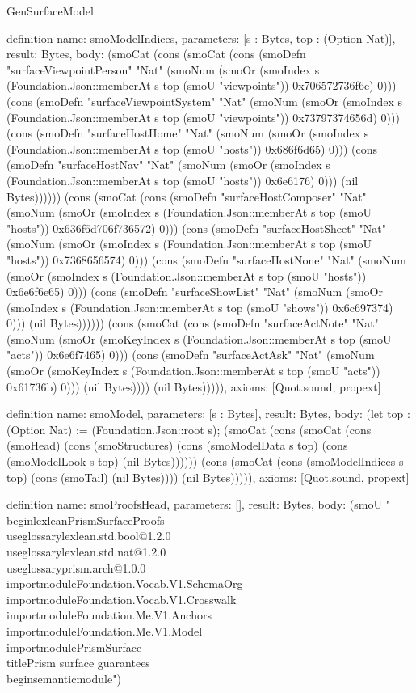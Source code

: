 \begin{lexlean}{GenSurfaceModel}
\begin{semanticmodule}
definition{
  name: smoModelIndices,
  parameters: [s : Bytes, top : (Option Nat)],
  result: Bytes,
  body: (smoCat (cons (smoCat (cons (smoDefn "surfaceViewpointPerson" "Nat" (smoNum (smoOr (smoIndex s (Foundation.Json::memberAt s top (smoU "viewpoints")) 0x706572736f6e) 0))) (cons (smoDefn "surfaceViewpointSystem" "Nat" (smoNum (smoOr (smoIndex s (Foundation.Json::memberAt s top (smoU "viewpoints")) 0x73797374656d) 0))) (cons (smoDefn "surfaceHostHome" "Nat" (smoNum (smoOr (smoIndex s (Foundation.Json::memberAt s top (smoU "hosts")) 0x686f6d65) 0))) (cons (smoDefn "surfaceHostNav" "Nat" (smoNum (smoOr (smoIndex s (Foundation.Json::memberAt s top (smoU "hosts")) 0x6e6176) 0))) (nil Bytes)))))) (cons (smoCat (cons (smoDefn "surfaceHostComposer" "Nat" (smoNum (smoOr (smoIndex s (Foundation.Json::memberAt s top (smoU "hosts")) 0x636f6d706f736572) 0))) (cons (smoDefn "surfaceHostSheet" "Nat" (smoNum (smoOr (smoIndex s (Foundation.Json::memberAt s top (smoU "hosts")) 0x7368656574) 0))) (cons (smoDefn "surfaceHostNone" "Nat" (smoNum (smoOr (smoIndex s (Foundation.Json::memberAt s top (smoU "hosts")) 0x6e6f6e65) 0))) (cons (smoDefn "surfaceShowList" "Nat" (smoNum (smoOr (smoIndex s (Foundation.Json::memberAt s top (smoU "shows")) 0x6c697374) 0))) (nil Bytes)))))) (cons (smoCat (cons (smoDefn "surfaceActNote" "Nat" (smoNum (smoOr (smoKeyIndex s (Foundation.Json::memberAt s top (smoU "acts")) 0x6e6f7465) 0))) (cons (smoDefn "surfaceActAsk" "Nat" (smoNum (smoOr (smoKeyIndex s (Foundation.Json::memberAt s top (smoU "acts")) 0x61736b) 0))) (nil Bytes)))) (nil Bytes))))),
  axioms: [Quot.sound, propext]
}

definition{
  name: smoModel,
  parameters: [s : Bytes],
  result: Bytes,
  body: (let top : (Option Nat) := (Foundation.Json::root s); (smoCat (cons (smoCat (cons (smoHead) (cons (smoStructures) (cons (smoModelData s top) (cons (smoModelLook s top) (nil Bytes)))))) (cons (smoCat (cons (smoModelIndices s top) (cons (smoTail) (nil Bytes)))) (nil Bytes))))),
  axioms: [Quot.sound, propext]
}

definition{
  name: smoProofsHead,
  parameters: [],
  result: Bytes,
  body: (smoU "\\begin{lexlean}{PrismSurfaceProofs}\n\\useglossary{lexlean.std.bool@1.2.0}\n\\useglossary{lexlean.std.nat@1.2.0}\n\\useglossary{prism.arch@1.0.0}\n\\importmodule{Foundation.Vocab.V1.SchemaOrg}\n\\importmodule{Foundation.Vocab.V1.Crosswalk}\n\\importmodule{Foundation.Me.V1.Anchors}\n\\importmodule{Foundation.Me.V1.Model}\n\\importmodule{PrismSurface}\n\\title{Prism surface guarantees}\n\\begin{semanticmodule}\n")
}


\end{semanticmodule}
\end{lexlean}
